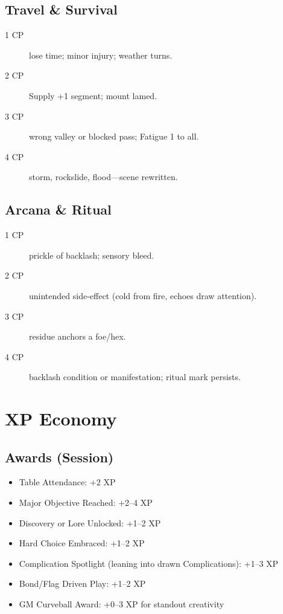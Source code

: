 \subsection{Travel \& Survival}

\begin{description}
\item[1 CP] lose time; minor injury; weather turns.
\item[2 CP] Supply +1 segment; mount lamed.
\item[3 CP] wrong valley or blocked pass; Fatigue 1 to all.
\item[4 CP] storm, rockslide, flood---scene rewritten.
\end{description}

\subsection{Arcana \& Ritual}

\begin{description}
\item[1 CP] prickle of backlash; sensory bleed.
\item[2 CP] unintended side-effect (cold from fire, echoes draw attention).
\item[3 CP] residue anchors a foe/hex.
\item[4 CP] backlash condition or manifestation; ritual mark persists.
\end{description}

\section{XP Economy}

\subsection{Awards (Session)}

\begin{itemize}
\item Table Attendance: +2 XP
\item Major Objective Reached: +2--4 XP
\item Discovery or Lore Unlocked: +1--2 XP
\item Hard Choice Embraced: +1--2 XP
\item Complication Spotlight (leaning into drawn Complications): +1--3 XP
\item Bond/Flag Driven Play: +1--2 XP
\item GM Curveball Award: +0--3 XP for standout creativity
\end{itemize}

